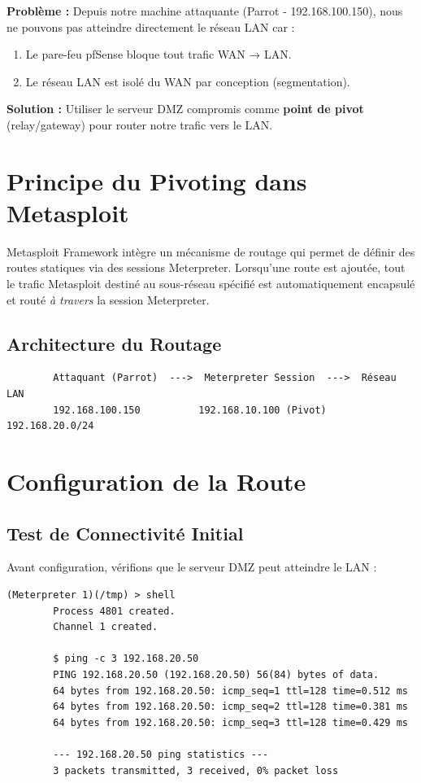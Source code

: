 \documentclass[12pt,a4paper,openany]{report}
\begin{document}
	\textbf{Problème :} Depuis notre machine attaquante (Parrot - 192.168.100.150), nous ne pouvons pas atteindre directement le réseau LAN car :
	\begin{enumerate}
		\item Le pare-feu pfSense bloque tout trafic WAN → LAN.
		\item Le réseau LAN est isolé du WAN par conception (segmentation).
	\end{enumerate}
	
	\textbf{Solution :} Utiliser le serveur DMZ compromis comme \textbf{point de pivot} (relay/gateway) pour router notre trafic vers le LAN.
	
	\section{Principe du Pivoting dans Metasploit}
	
	Metasploit Framework intègre un mécanisme de routage qui permet de définir des routes statiques via des sessions Meterpreter. Lorsqu'une route est ajoutée, tout le trafic Metasploit destiné au sous-réseau spécifié est automatiquement encapsulé et routé \textit{à travers} la session Meterpreter.
	
	\subsection{Architecture du Routage}
	
	\begin{verbatim}
		Attaquant (Parrot)  --->  Meterpreter Session  --->  Réseau LAN
		192.168.100.150          192.168.10.100 (Pivot)      192.168.20.0/24
	\end{verbatim}
	
	\section{Configuration de la Route}
	
	\subsection{Test de Connectivité Initial}
	
	Avant configuration, vérifions que le serveur DMZ peut atteindre le LAN :
	
	\begin{lstlisting}[caption=Test Ping depuis Meterpreter]
		(Meterpreter 1)(/tmp) > shell
		Process 4801 created.
		Channel 1 created.
		
		$ ping -c 3 192.168.20.50
		PING 192.168.20.50 (192.168.20.50) 56(84) bytes of data.
		64 bytes from 192.168.20.50: icmp_seq=1 ttl=128 time=0.512 ms
		64 bytes from 192.168.20.50: icmp_seq=2 ttl=128 time=0.381 ms
		64 bytes from 192.168.20.50: icmp_seq=3 ttl=128 time=0.429 ms
		
		--- 192.168.20.50 ping statistics ---
		3 packets transmitted, 3 received, 0% packet loss
	\end{lstlisting}
	
\end{document}
